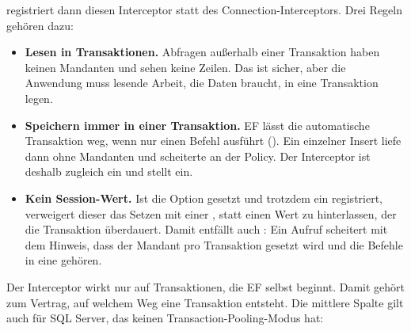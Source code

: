  registriert dann diesen
Interceptor statt des Connection-Interceptors. Drei Regeln gehören dazu:

\begin{itemize}
  \item \textbf{Lesen in Transaktionen.} Abfragen außerhalb einer Transaktion haben keinen
    Mandanten und sehen keine Zeilen. Das ist sicher, aber die Anwendung muss lesende Arbeit,
    die Daten braucht, in eine Transaktion legen.
  \item \textbf{Speichern immer in einer Transaktion.} EF lässt die automatische Transaktion
    weg, wenn  nur einen Befehl ausführt
    ().
    Ein einzelner Insert liefe dann ohne Mandanten und scheiterte an der Policy. Der Interceptor
    ist deshalb zugleich ein  und stellt
     ein.
  \item \textbf{Kein Session-Wert.} Ist die Option gesetzt und trotzdem ein
     registriert, verweigert dieser
    das Setzen mit einer , statt einen Wert zu
    hinterlassen, der die Transaktion überdauert. Damit entfällt auch
    : Ein Aufruf scheitert mit dem Hinweis,
    dass der Mandant pro Transaktion gesetzt wird und die Befehle in eine gehören.
\end{itemize}

Der Interceptor wirkt nur auf Transaktionen, die EF selbst beginnt. Damit gehört zum Vertrag,
auf welchem Weg eine Transaktion entsteht. Die mittlere Spalte gilt auch für SQL Server, das
keinen Transaction-Pooling-Modus hat:

